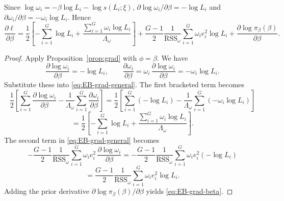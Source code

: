 \begin{corollary}
\label{cor:grad-beta}
Since \(\log\omega_i=-\beta\log L_i-\log s(L_i;\xi)\),
\(\partial \log\omega_i/\partial\beta=-\log L_i\) and \(\partial \omega_i/\partial\beta=-\omega_i \log L_i\).
Hence
\begin{equation}
\label{eq:EB-grad-beta}
\frac{\partial \ell}{\partial \beta}
=\frac{1}{2}\!\left[-\sum_{i=1}^G \log L_i
+\frac{\sum_{i=1}^G \omega_i \log L_i}{\Lambda_\omega}\right]
+\frac{G-1}{2}\frac{1}{\mathrm{RSS}_\omega}\sum_{i=1}^G \omega_i e_i^2 \log L_i
+\frac{\partial \log \pi_\beta(\beta)}{\partial \beta}.
\end{equation}
\end{corollary}
\begin{proof}
Apply Proposition~\ref{prop:grad} with \(\phi=\beta\).
We have
\[
\frac{\partial \log\omega_i}{\partial\beta}
=-\log L_i,
\qquad
\frac{\partial \omega_i}{\partial\beta}
=\omega_i\,\frac{\partial \log\omega_i}{\partial\beta}
=-\omega_i \log L_i.
\]
Substitute these into \eqref{eq:EB-grad-general}.
The first bracketed term becomes
\[
\frac{1}{2}\left[
\sum_{i=1}^G \frac{\partial \log\omega_i}{\partial\beta}
-\frac{1}{\Lambda_\omega}\sum_{i=1}^G \frac{\partial \omega_i}{\partial\beta}
\right]
=\frac{1}{2}\left[
\sum_{i=1}^G (-\log L_i)
-\frac{1}{\Lambda_\omega}\sum_{i=1}^G (-\omega_i \log L_i)
\right]
\]
\[
=\frac{1}{2}\left[
-\sum_{i=1}^G \log L_i
+\frac{\sum_{i=1}^G \omega_i \log L_i}{\Lambda_\omega}
\right].
\]
The second term in \eqref{eq:EB-grad-general} becomes
\[
-\frac{G-1}{2}\frac{1}{\mathrm{RSS}_\omega}
\sum_{i=1}^G \omega_i e_i^2\,\frac{\partial \log\omega_i}{\partial\beta}
=-\frac{G-1}{2}\frac{1}{\mathrm{RSS}_\omega}
\sum_{i=1}^G \omega_i e_i^2 (-\log L_i)
\]
\[
=\frac{G-1}{2}\frac{1}{\mathrm{RSS}_\omega}
\sum_{i=1}^G \omega_i e_i^2 \log L_i.
\]
Adding the prior derivative \(\partial \log \pi_\beta(\beta)/\partial\beta\) yields \eqref{eq:EB-grad-beta}.
\end{proof}

